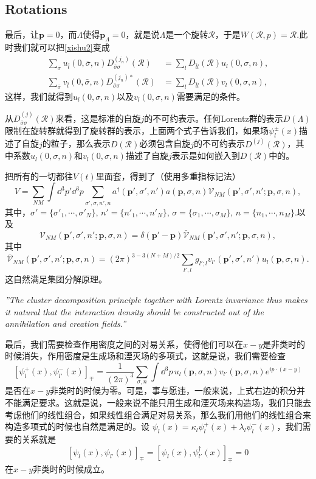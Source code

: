 \documentclass[9pt]{extbook}
\theoremstyle{plain}%
\newcommand{\re}[1]
	{\begin{center}
		\colorbox{shadecolor}{
	
		\begin{minipage}{135mm}
				\emph{''#1''}
			\end{minipage}}
	\end{center}}
\begin{document}
\subsection*{Rotations}
最后，让$\mathbf{p}=0$，而$\Lambda$使得$\mathbf{p}_\Lambda=0$，就是说$\Lambda$是一个旋转$\mathscr{R}$，于是$W(\mathscr{R},p)=\mathscr{R}$.此时我们就可以把\eqref{xishu2}变成
\[
	\begin{split}
		\sum_{\bar{\sigma}}u_{\bar{l}}(0,\bar{\sigma},n)D^{(j_n)}_{\bar{\sigma}\sigma}\left(\mathscr{R}\right) & =\sum_{l} D_{\bar{l}l}(\mathscr{R})u_{l}(0,\sigma,n),\\
		\sum_{\bar{\sigma}}v_{\bar{l}}(0,\bar{\sigma},n)D^{(j_n)*}_{\bar{\sigma}\sigma}\left(\mathscr{R}\right) & =\sum_{l} D_{\bar{l}l}(\mathscr{R})v_{l}(0,\sigma,n),
	\end{split}
\]
这样，我们就得到$u_{l}(0,\sigma,n)$以及$v_{l}(0,\sigma,n)$需要满足的条件。

从$D^{(j)}_{\bar{\sigma}\sigma}\left(\mathscr{R}\right)$来看，这是标准的自旋$j$的不可约表示。任何Lorentz群的表示$D(\Lambda)$限制在旋转群就得到了旋转群的表示，上面两个式子告诉我们，如果场$\psi^\pm_l(x)$描述了自旋$j$的粒子，那么表示$D(\mathscr{R})$必须包含自旋$j$的不可约表示$D^{(j)}\left(\mathscr{R}\right)$，其中系数$u_{l}(0,\sigma,n)$和$v_{l}(0,\sigma,n)$描述了自旋$j$表示是如何嵌入到$D(\mathscr{R})$中的。

把所有的一切都往$V(t)$里面套，得到了（使用多重指标记法）
\[
	V=\sum_{NM}\int \dd^3 p'\dd^3 p \sum_{\sigma',\sigma,n',n}a^\dag(\mathbf{p}',\sigma',n')a(\mathbf{p},\sigma,n)\mathscr{V}_{NM}(\mathbf{p}',\sigma',n';\mathbf{p},\sigma,n),
\]
其中，$\sigma'=\{\sigma'_1,\cdots,\sigma'_N\}$, $n'=\{n'_1,\cdots,n'_N\}$, $\sigma=\{\sigma_1,\cdots,\sigma_M\}$, $n=\{n_1,\cdots,n_M\}$.以及
\[
	\mathscr{V}_{NM}(\mathbf{p}',\sigma',n';\mathbf{p},\sigma,n)=\delta(\mathbf{p}'-\mathbf{p})\bar{\mathscr{V}}_{NM}(\mathbf{p}',\sigma',n';\mathbf{p},\sigma,n),
\]
其中
\[
	\bar{\mathscr{V}}_{NM}(\mathbf{p}',\sigma',n';\mathbf{p},\sigma,n)=(2\pi)^{3-3(N+M)/2}\sum_{l',l}g_{l';l}v_{l'}(\mathbf{p}',\sigma',n')u_l(\mathbf{p},\sigma,n).
\]
这自然满足集团分解原理。
\re{The cluster decomposition principle together with Lorentz invariance thus makes it natural that the interaction density should be constructed out of the annihilation and creation fields.}

最后，我们需要检查作用密度之间的对易关系，使得他们可以在$x-y$是非类时的时候消失，作用密度是生成场和湮灭场的多项式，这就是说，我们需要检查
\[
	[\psi_l^+(x),\psi_{l'}^-(x)]_{\mp}=\frac{1}{(2\pi)^3}\sum_{\sigma,n}\int\dd^3 p\, u_{l}(\mathbf{p},\sigma,n)v_{l'}(\mathbf{p},\sigma,n)e^{ip\cdot (x-y)}
\]
是否在$x-y$非类时的时候为零。可是，事与愿违，一般来说，上式右边的积分并不能满足要求。这就是说，一般来说不能只用生成和湮灭场来构造场，我们只能去考虑他们的线性组合，如果线性组合满足对易关系，那么我们用他们的线性组合来构造多项式的时候也自然是满足的。设
$\psi_l(x)=\kappa_l\psi_l^+(x)+\lambda_l\psi_l^-(x)$，我们需要的关系就是
\[
	[\psi_l(x),\psi_{l'}(x)]_{\mp}=[\psi_l(x),\psi^\dag_{l'}(x)]_{\mp}=0
\]
在$x-y$非类时的时候成立。
\end{document}
